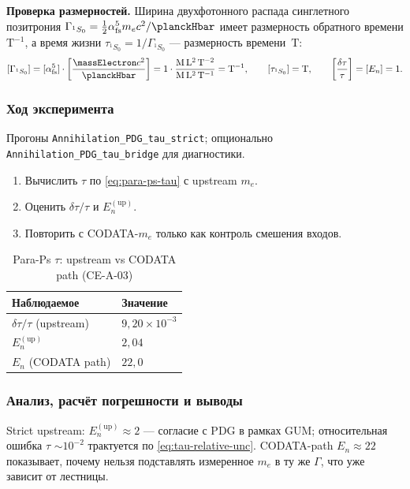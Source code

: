\textbf{Проверка размерностей.}
Ширина двухфотонного распада синглетного позитрония $\Gamma_{^1S_0} = \frac{1}{2}\alpha_{\mathrm{fs}}^5 m_e c^2/\planckHbar$ имеет размерность обратного времени $\mathrm{T^{-1}}$, а время жизни $\tau_{^1S_0} = 1/\Gamma_{^1S_0}$ --- размерность времени~$\mathrm{T}$:
\[
  [\Gamma_{^1S_0}] = [\alpha_{\mathrm{fs}}^5]\cdot\left[\frac{\massElectron c^2}{\planckHbar}\right] = 1\cdot\frac{\mathrm{M\,L^2\,T^{-2}}}{\mathrm{M\,L^2\,T^{-1}}} = \mathrm{T^{-1}},\qquad
  [\tau_{^1S_0}] = \mathrm{T},\qquad
  \left[\frac{\delta\tau}{\tau}\right] = [E_n] = 1.
\]

\subsubsection*{Ход эксперимента}
Прогоны \texttt{Annihilation\_PDG\_tau\_strict}; опционально \texttt{Annihilation\_PDG\_tau\_bridge} для диагностики.

\begin{enumerate}[label=\textbf{Шаг \arabic*:},leftmargin=*,itemsep=0.35em]
\item Вычислить $\tau$ по \eqref{eq:para-ps-tau} с upstream $m_e$.
\item Оценить $\delta\tau/\tau$ и $E_n^{(\mathrm{up})}$.
\item Повторить с CODATA-$m_e$ только как контроль смешения входов.
\end{enumerate}

\begin{table}[htbp]
\centering
\small
\caption{Para-Ps $\tau$: upstream vs CODATA path (CE-A-03)}
\label{tab:exp-ce-a-03}
\begin{tabular}{@{}ll@{}}
\toprule
Наблюдаемое & Значение \\
\midrule
$\delta\tau/\tau$ (upstream) & $9{,}20\times 10^{-3}$ \\
$E_n^{(\mathrm{up})}$ & $2{,}04$ \\
$E_n$ (CODATA path) & $22{,}0$ \\
\bottomrule
\end{tabular}
\end{table}

\subsubsection*{Анализ, расчёт погрешности и выводы}
Strict upstream: $E_n^{(\mathrm{up})}\approx 2$ --- согласие с PDG в рамках GUM; относительная ошибка $\tau$ $\sim 10^{-2}$ трактуется по \eqref{eq:tau-relative-unc}.
CODATA-path $E_n\approx 22$ показывает, почему нельзя подставлять измеренное $m_e$ в ту же $\Gamma$, что уже зависит от лестницы.

